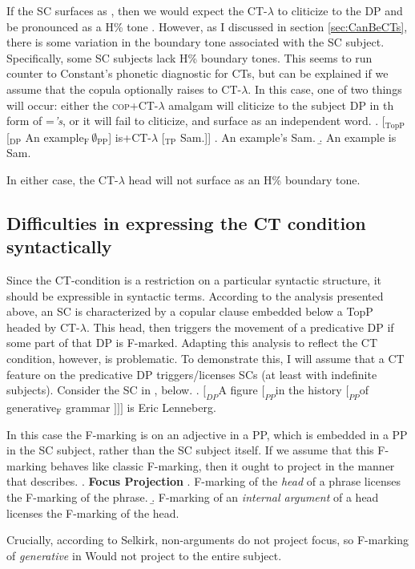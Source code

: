 \documentclass[letterpaper]{article}
\begin{document}
If the SC surfaces as \Last, then we would expect the CT-$\lambda$ to cliticize to the DP and be pronounced as a H\% tone \parencite[following][]{constant2014diss}.
However, as I discussed in section \ref{sec:CanBeCTs}, there is some variation in the boundary tone associated with the SC subject.
Specifically, some SC subjects lack H\% boundary tones.
This seems to run counter to Constant's phonetic diagnostic for CTs, but can be explained if we assume that the copula optionally raises to CT-$\lambda$.
In this case, one of two things will occur: either the \textsc{cop}+CT-$\lambda$ amalgam will cliticize to the subject DP in th form of =\textit{'s}, or it will fail to cliticize, and surface as an independent word.
\ex. [$_\text{TopP}$ [$_\text{DP}$ An example$_\text{F}\,\emptyset_\text{PP}$] is+CT-$\lambda$ [$_\text{TP}$ Sam.]]
\a. An example's Sam.
\b. An example is Sam.

In either case, the CT-$\lambda$ head will not surface as an H\% boundary tone.

\subsection{Difficulties in expressing the CT condition syntactically}
Since the CT-condition is a restriction on a particular syntactic structure, it should be expressible in syntactic terms.
According to the analysis presented above, an SC is characterized by a copular clause embedded below a TopP headed by CT-$\lambda$.
This head, then triggers the movement of a predicative DP if some part of that DP is F-marked.
Adapting this analysis to reflect the CT condition, however, is problematic.
To demonstrate this, I will assume that a CT feature on the predicative DP triggers/licenses SCs (at least with indefinite subjects).
Consider the SC in \Next, below.
\ex. $[_{DP}$A figure $[_{PP}$in the history $[_{PP}$of generative$_\text{F}$ grammar $]]]$ is Eric Lenneberg.

In this case the F-marking is on an adjective in a PP, which is embedded in a PP in the SC subject, rather than the SC subject itself.
If we assume that this F-marking behaves like classic F-marking, then it ought to project in the manner that \textcite{selkirk1996sentence} describes.
\ex. \textbf{Focus Projection} \parencite{selkirk1996sentence}
\a. F-marking of the \textit{head} of a phrase licenses the F-marking of the phrase.
\b. F-marking of an \textit{internal argument} of a head licenses the F-marking of the head.

Crucially, according to Selkirk, non-arguments do not project focus, so F-marking of \textit{generative} in \LLast Would not project to the entire subject.
\end{document}
